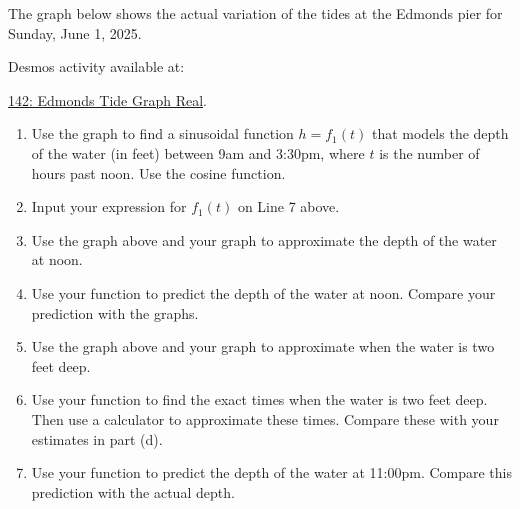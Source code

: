 \documentclass{ximera}
\begin{document}
\begin{example} \label{EXPODFefeRE}
The graph below shows the actual variation of the tides at the Edmonds pier for Sunday, June 1, 2025.


Desmos activity available at:

\href{https://www.desmos.com/calculator/kbjvcy5bs1}{142: Edmonds Tide Graph Real}.

 
\begin{onlineOnly}
    \begin{center}
\end{center}
\end{onlineOnly}

\begin{enumerate}
\item Use the graph to find a sinusoidal function $h=f_1(t)$ that models the depth of the water (in feet) between 9am and 3:30pm, where $t$ is the number of hours past noon. Use the cosine function.

\item Input your expression for $f_1(t)$ on Line 7 above.

\item Use the graph above and  your graph to approximate the depth of the water at noon.

\item Use your function to predict the depth of the water at noon. Compare your prediction with the graphs.

\item Use the graph above and  your graph to approximate when the water is two feet deep.


\item Use your function to find the exact times when the water is two feet deep. Then use a calculator to approximate these times.  Compare these with your estimates in part (d).

\item Use your function to predict the depth of the water at 11:00pm. Compare this prediction with the actual depth.
\end{enumerate}



\end{example}
\end{document}
